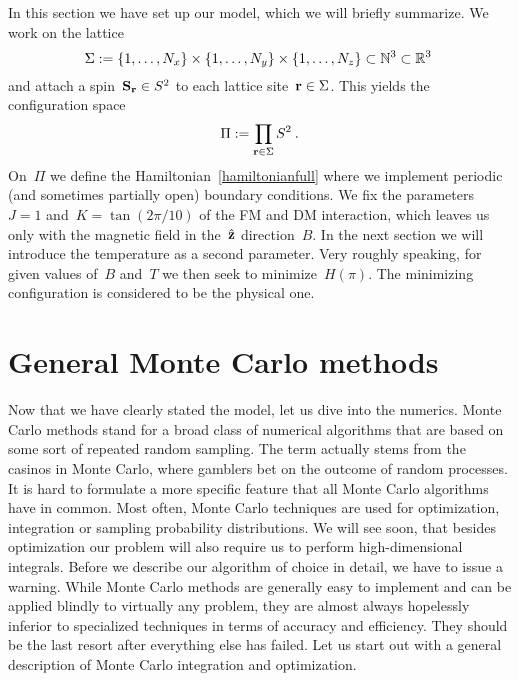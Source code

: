 In this section we have set up our model, which we will briefly summarize. We
work on the lattice
%
\begin{equation}
  \Sigma := \{1,\dots,N_x\} \times \{1,\dots,N_y\} \times
  \{1,\dots,N_z\} \subset \mathbb{N}^3 \subset \mathbb{R}^3\:
\end{equation}
%
and attach a spin~$\mathbf{S}_{\mathbf{r}} \in S^2$ to each lattice site~$\mathbf{r} \in \Sigma$. This
yields the configuration space
%
\begin{equation}
  \Pi := \prod_{\mathbf{r} \in \Sigma} S^2\:.
\end{equation}
%
On~$\Pi$ we define the Hamiltonian~\eqref{hamiltonianfull} where we implement
periodic (and sometimes partially open) boundary conditions. We fix the
parameters~$J=1$ and~$K=\tan(2\pi / 10)$ of the FM and DM interaction, which
leaves us only with the magnetic field in the~$\hat{\mathbf{z}}$ direction~$B$. In the next
section we will introduce the temperature as a second parameter. Very roughly
speaking, for given values of~$B$ and~$T$ we then seek to minimize~$H(\pi)$. The
minimizing configuration is considered to be the physical one.
%
\section{General Monte Carlo methods}\label{sec:mctheory}
%
Now that we have clearly stated the model, let us dive into the numerics. Monte
Carlo methods stand for a broad class of numerical algorithms that are based on
some sort of repeated random sampling. The term actually stems from the casinos
in Monte Carlo, where gamblers bet on the outcome of random processes. It is
hard to formulate a more specific feature that all Monte Carlo algorithms have
in common. Most often, Monte Carlo techniques are used for optimization,
integration or sampling probability distributions. We will see soon, that
besides optimization our problem will also require us to perform
high-dimensional integrals. Before we describe our algorithm of choice in
detail, we have to issue a warning. While Monte Carlo methods are generally easy
to implement and can be applied blindly to virtually any problem, they are
almost always hopelessly inferior to specialized techniques in terms of accuracy
and efficiency. They should be the last resort after everything else has failed.
Let us start out with a general description of Monte Carlo integration and
optimization.

